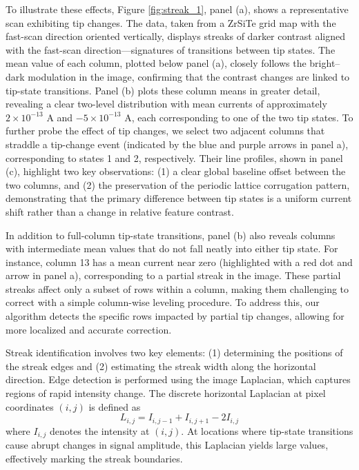To illustrate these effects, Figure \ref{fig:streak_1}, panel (a), shows a representative scan exhibiting tip changes. The data, taken from a ZrSiTe grid map with the fast-scan direction oriented vertically, displays streaks of darker contrast aligned with the fast-scan direction—signatures of transitions between tip states. The mean value of each column, plotted below panel (a), closely follows the bright–dark modulation in the image, confirming that the contrast changes are linked to tip-state transitions. Panel (b) plots these column means in greater detail, revealing a clear two-level distribution with mean currents of approximately $2\times10^{-13}$ A and $-5\times10^{-13}$ A, each corresponding to one of the two tip states. To further probe the effect of tip changes, we select two adjacent columns that straddle a tip-change event (indicated by the blue and purple arrows in panel a), corresponding to states 1 and 2, respectively. Their line profiles, shown in panel (c), highlight two key observations: (1) a clear global baseline offset between the two columns, and (2) the preservation of the periodic lattice corrugation pattern, demonstrating that the primary difference between tip states is a uniform current shift rather than a change in relative feature contrast.

In addition to full-column tip-state transitions, panel (b) also reveals columns with intermediate mean values that do not fall neatly into either tip state. For instance, column 13 has a mean current near zero (highlighted with a red dot and arrow in panel a), corresponding to a partial streak in the image. These partial streaks affect only a subset of rows within a column, making them challenging to correct with a simple column-wise leveling procedure. To address this, our algorithm detects the specific rows impacted by partial tip changes, allowing for more localized and accurate correction.

Streak identification involves two key elements: (1) determining the positions of the streak edges and (2) estimating the streak width along the horizontal direction. Edge detection is performed using the image Laplacian, which captures regions of rapid intensity change. The discrete horizontal Laplacian at pixel coordinates $(i,j)$ is defined as
$$L_{i,j} = I_{i,j-1} + I_{i,j+1} - 2I_{i,j}$$
where $I_{i,j}$ denotes the intensity at $(i,j)$. At locations where tip-state transitions cause abrupt changes in signal amplitude, this Laplacian yields large values, effectively marking the streak boundaries.

